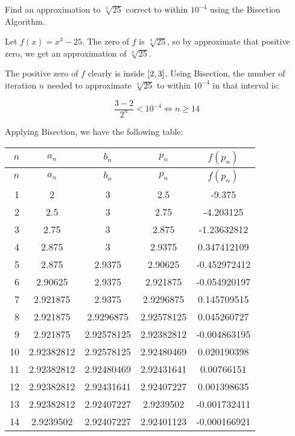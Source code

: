 \documentclass[../../Assignments.tex]{subfiles}
\begin{document}
\begin{exercise}
    Find an approximation to \(\sqrt[3]{25}\) correct to within \(10^{−4}\)
    using the Bisection Algorithm.
\end{exercise}

\begin{solution}
    Let \(f(x) = x^3 - 25\). The zero of \(f\) is \(\sqrt[3]{25}\), so by
    approximate that positive zero, we get an approximation of \(\sqrt[3]{25}\).

    The positive zero of \(f\) clearly is inside \(\interval{2}{3}\). Using
    Bisection, the number of iteration \(n\) needed to approximate
    \(\sqrt[3]{25}\) to within \(10^{-4}\) in that interval is:

    \[\frac{3 - 2}{2^n} < 10^{-4} \iff n \geq 14\]

    Applying Bisection, we have the following table:

    \begin{longtable}{r S[table-format=1.8] S[table-format=1.8] S[table-format=1.8] S[table-format=-1.9]}
        \toprule
        \(n\)  &   {\(a_n\)}   &   {\(b_n\)}   &   {\(p_n\)}   &  {\(f(p_n)\)}  \\
        \midrule
        \endfirsthead
        \toprule
        \(n\)  &   {\(a_n\)}   &   {\(b_n\)}   &   {\(p_n\)}   &  {\(f(p_n)\)}  \\
        \midrule
          &  2            &  3            &  2.5          &  -9.375        \\
            2  &  2.5          &  3            &  2.75         &  -4.203125     \\
            3  &  2.75         &  3            &  2.875        &  -1.23632812   \\
            4  &  2.875        &  3            &  2.9375       &   0.347412109  \\
            5  &  2.875        &  2.9375       &  2.90625      &  -0.452972412  \\
            6  &  2.90625      &  2.9375       &  2.921875     &  -0.054920197  \\
            7  &  2.921875     &  2.9375       &  2.9296875    &   0.145709515  \\
            8  &  2.921875     &  2.9296875    &  2.92578125   &   0.045260727  \\
            9  &  2.921875     &  2.92578125   &  2.92382812   &  -0.004863195  \\
           10  &  2.92382812   &  2.92578125   &  2.92480469   &   0.020190398  \\
           11  &  2.92382812   &  2.92480469   &  2.92431641   &   0.00766151   \\
           12  &  2.92382812   &  2.92431641   &  2.92407227   &   0.001398635  \\
           13  &  2.92382812   &  2.92407227   &  2.9239502    &  -0.001732411  \\
           14  &  2.9239502    &  2.92407227   &  2.92401123   &  -0.000166921  \\
       \bottomrule
    \end{longtable}


\end{solution}
\end{document}
